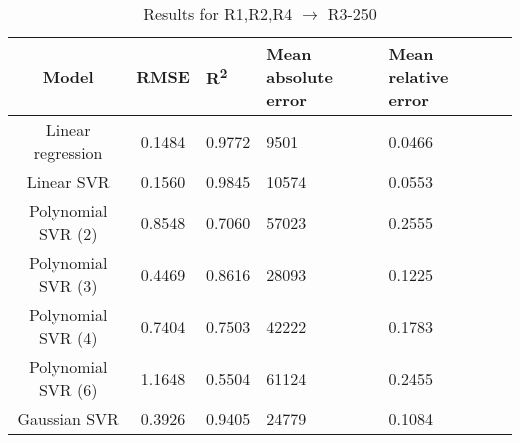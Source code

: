 \begin{table}[H]
\centering
\begin{adjustbox}{center}
\begin{tabular}{c | c M{1.2cm} M{2.5cm} M{2.5cm} M{1.8cm}}
Model & RMSE & R\textsuperscript{2} & Mean absolute error & Mean relative error \tabularnewline
\hline
Linear regression & 0.1484 & 0.9772 &   9501 & 0.0466 \\
Linear SVR & 0.1560 & 0.9845 &  10574 & 0.0553 \\
Polynomial SVR (2) & 0.8548 & 0.7060 &  57023 & 0.2555 \\
Polynomial SVR (3) & 0.4469 & 0.8616 &  28093 & 0.1225 \\
Polynomial SVR (4) & 0.7404 & 0.7503 &  42222 & 0.1783 \\
Polynomial SVR (6) & 1.1648 & 0.5504 &  61124 & 0.2455 \\
Gaussian SVR & 0.3926 & 0.9405 &  24779 & 0.1084 \\
\end{tabular}
\end{adjustbox}
\\
\caption{Results for R1,R2,R4 $\rightarrow$ R3-250}
\label{tab:coreonly_linear_R1,R2,R4_R3_250}
\end{table}
